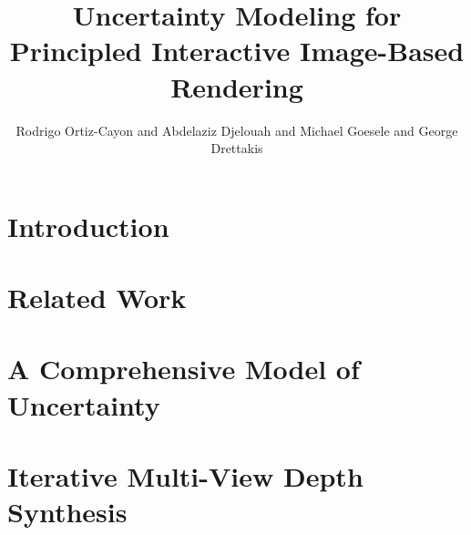 \documentclass[review]{acmsiggraph}
\title{Uncertainty Modeling for Principled Interactive Image-Based Rendering}
\author{ Rodrigo Ortiz-Cayon and Abdelaziz Djelouah and Michael Goesele and George Drettakis}
\begin{document}
\maketitle

 \teaser{
 }

\maketitle


\begin{abstract}

\end{abstract}

%
\copyrightspace

\section{Introduction}


\section{Related Work}


%

\section{A Comprehensive Model of Uncertainty}


\section{Iterative Multi-View Depth Synthesis \label{sec:synth}}

\end{document}
